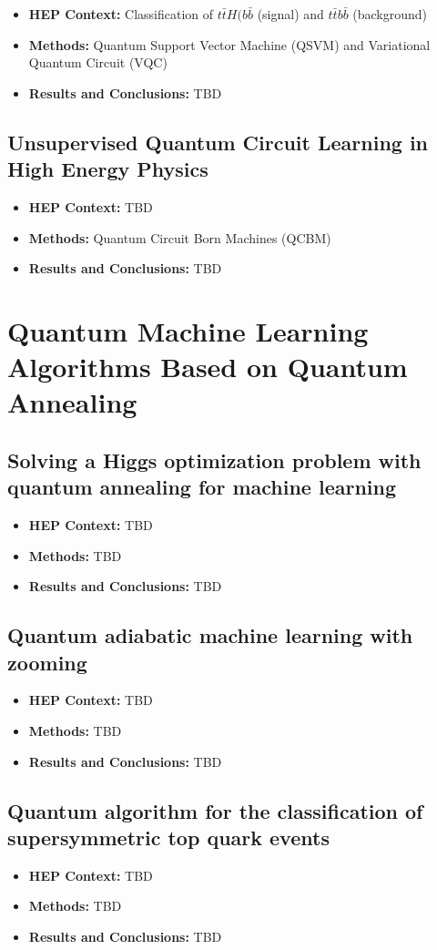 \begin{itemize}
	\item \textbf{HEP Context: }Classification of $t\bar{t}H(b\bar{b}$ (signal) and $t\bar{t}b\bar{b}$ (background)
	\item \textbf{Methods: }Quantum Support Vector Machine (QSVM) and Variational Quantum Circuit (VQC)
	\item \textbf{Results and Conclusions: }TBD
\end{itemize}\subsection{Unsupervised Quantum Circuit Learning in High Energy Physics~\cite{Delgado:2022aty}}
\begin{itemize}
	\item \textbf{HEP Context: }TBD
	\item \textbf{Methods: }Quantum Circuit Born Machines (QCBM)
	\item \textbf{Results and Conclusions: }TBD
\end{itemize}

\section{Quantum Machine Learning Algorithms Based on Quantum Annealing}

\subsection{Solving a Higgs optimization problem with quantum annealing for machine learning~\cite{Mott:2017xdb}}
\begin{itemize}
	\item \textbf{HEP Context: }TBD
	\item \textbf{Methods: }TBD
	\item \textbf{Results and Conclusions: }TBD
\end{itemize}\subsection{Quantum adiabatic machine learning with zooming~\cite{Zlokapa:2019lvv}}
\begin{itemize}
	\item \textbf{HEP Context: }TBD
	\item \textbf{Methods: }TBD
	\item \textbf{Results and Conclusions: }TBD
\end{itemize}\subsection{Quantum algorithm for the classification of supersymmetric top quark events~\cite{Bargassa:2021jmk}}
\begin{itemize}
	\item \textbf{HEP Context: }TBD
	\item \textbf{Methods: }TBD
	\item \textbf{Results and Conclusions: }TBD
\end{itemize}

